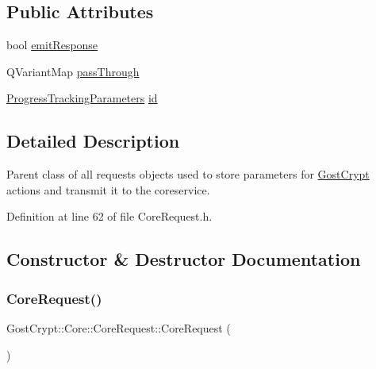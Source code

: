 \subsection*{Public Attributes}
\begin{DoxyCompactItemize}
\item 
bool \hyperlink{struct_gost_crypt_1_1_core_1_1_core_request_a6095cfc0fbcd8db7d3513c3e0749d63f}{emit\+Response}
\item 
Q\+Variant\+Map \hyperlink{struct_gost_crypt_1_1_core_1_1_core_request_a50bfb2598940d867992ec364f37d57ec}{pass\+Through}
\item 
\hyperlink{struct_gost_crypt_1_1_core_1_1_progress_tracking_parameters}{Progress\+Tracking\+Parameters} \hyperlink{struct_gost_crypt_1_1_core_1_1_core_request_adf72d60e06f395bc4bc09a00c981b734}{id}
\end{DoxyCompactItemize}


\subsection{Detailed Description}
Parent class of all requests objects used to store parameters for \hyperlink{namespace_gost_crypt}{Gost\+Crypt} actions and transmit it to the coreservice. 

Definition at line 62 of file Core\+Request.\+h.



\subsection{Constructor \& Destructor Documentation}
\mbox{\label{struct_gost_crypt_1_1_core_1_1_core_request_a3cbc4ff535bca080f06baf400336c8af}} 
\subsubsection{\texorpdfstring{Core\+Request()}{CoreRequest()}}
{\footnotesize\ttfamily Gost\+Crypt\+::\+Core\+::\+Core\+Request\+::\+Core\+Request (\begin{DoxyParamCaption}{ }\end{DoxyParamCaption})\hspace{0.3cm}{\ttfamily [inline]}}



